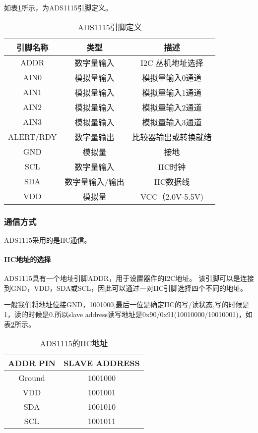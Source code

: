 \documentclass[lang=cn,11pt,a4paper]{elegantpaper}
\begin{document}
如表\ref{tab:ADS1115引脚定义}所示，为ADS1115引脚定义。

\begin{table}[!ht]
  \centering
  \caption{ADS1115引脚定义}
  \begin{tabular}{ccc}
    \textbf{引脚名称} & \textbf{类型} & \textbf{描述 }   \\ \hline
    ADDR          & 数字量输入       & I2C 丛机地址选择     \\
    AIN0          & 模拟量输入       & 模拟量输入0通道       \\
    AIN1          & 模拟量输入       & 模拟量输入1通道       \\
    AIN2          & 模拟量输入       & 模拟量输入2通道       \\
    AIN3          & 模拟量输入       & 模拟量输入3通道       \\
    ALERT/RDY     & 数字量输出       & 比较器输出或转换就绪     \\
    GND           & 模拟量         & 接地             \\
    SCL           & 数字量输入       & IIC时钟          \\
    SDA           & 数字量输入/输出    & IIC数据线         \\
    VDD           & 模拟量         & VCC（2.0V-5.5V) \\
  \end{tabular}
  \label{tab:ADS1115引脚定义}
\end{table}

\subsubsection{通信方式}
ADS1115采用的是IIC通信。
\paragraph{IIC地址的选择}
ADS1115具有一个地址引脚ADDR，用于设置器件的I2C地址。 该引脚可以是连接到GND，VDD，SDA或SCL，因此可以通过一对IIC引脚选择四个不同的地址。

一般我们将地址位接GND，1001000,最后一位是确定IIC的写/读状态,写的时候是1，读的时候是0.所以slave address读写地址是0x90/0x91(10010000/10010001)，如表\ref{tab:IIC}所示。

\begin{table}[!ht]
  \centering
  \caption{ADS1115的IIC地址}
  \begin{tabular}{cc}
    \textbf{ADDR PIN} & \textbf{SLAVE ADDRESS } \\ \hline
    Ground            & 1001000                 \\
    VDD               & 1001001                 \\
    SDA               & 1001010                 \\
    SCL               & 1001011                 \\
  \end{tabular}
  \label{tab:IIC}
\end{table}
\end{document}
